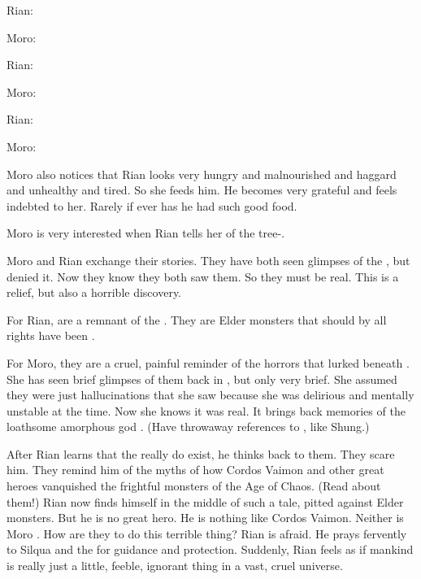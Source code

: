 Rian:

Moro:

Rian:

Moro:

Rian:

Moro:



\begin{comment}
  \section{Moro's chambers}
\end{comment}
Moro also notices that Rian looks very hungry and malnourished and haggard and unhealthy and tired. 
So she feeds him.
He becomes very grateful and feels indebted to her.
Rarely if ever has he had such good food. 

Moro is very interested when Rian tells her of the tree-\sphyle. 

Moro and Rian exchange their stories. 
They have both seen glimpses of the , but denied it.
Now they know they both saw them. 
So they must be real. 
This is a relief, but also a horrible discovery.

For Rian, \quiljaaran are a remnant of the .
They are Elder monsters that should by all rights have been . 

For Moro, they are a cruel, painful reminder of the horrors that lurked beneath \Yormis. 
She has seen brief glimpses of them back in \Yormis, but only very brief.
She assumed they were just hallucinations that she saw because she was delirious and mentally unstable at the time.
Now she knows it was real.
It brings back memories of the loathsome amorphous god \Ubloth. 
(Have throwaway references to , like Shung.)

After Rian learns that the \serpentmen really do exist, he thinks back to them.
They scare him.
They remind him of the myths of how Cordos Vaimon and other great heroes vanquished the frightful monsters of the Age of Chaos. 
(Read about them!)
Rian now finds himself in the middle of such a tale, pitted against Elder monsters.
But he is no great hero.
He is nothing like Cordos Vaimon. 
Neither is Moro \Cornel.
How are they to do this terrible thing? 
Rian is afraid. 
He prays fervently to Silqua and the \sephiroth for guidance and protection. 
Suddenly, Rian feels as if mankind is really just a little, feeble, ignorant thing in a vast, cruel universe. 

